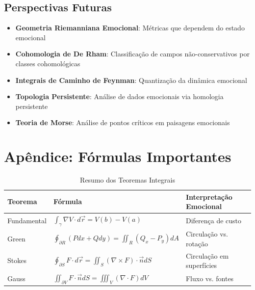 \documentclass[12pt, a4paper]{article}
\begin{document}
\subsection{Perspectivas Futuras}

\begin{itemize}
\item \textbf{Geometria Riemanniana Emocional}: Métricas que dependem do estado emocional
\item \textbf{Cohomologia de De Rham}: Classificação de campos não-conservativos por classes cohomológicas
\item \textbf{Integrais de Caminho de Feynman}: Quantização da dinâmica emocional
\item \textbf{Topologia Persistente}: Análise de dados emocionais via homologia persistente
\item \textbf{Teoria de Morse}: Análise de pontos críticos em paisagens emocionais
\end{itemize}

\section*{Apêndice: Fórmulas Importantes}

\begin{table}[H]
\centering
\caption{Resumo dos Teoremas Integrais}
\begin{tabular}{p{4cm}p{6cm}p{4cm}}
\toprule
\textbf{Teorema} & \textbf{Fórmula} & \textbf{Interpretação Emocional} \\
\midrule
Fundamental & $\int_\gamma \nabla V \cdot d\vec{r} = V(b) - V(a)$ & Diferença de custo \\
\hline
Green & $\oint_{\partial R} (P dx + Q dy) = \iint_R (Q_x - P_y) dA$ & Circulação vs. rotação \\
\hline
Stokes & $\oint_{\partial S} F \cdot d\vec{r} = \iint_S (\nabla \times F) \cdot \vec{n} dS$ & Circulação em superfícies \\
\hline
Gauss & $\iint_{\partial V} F \cdot \vec{n} dS = \iiint_V (\nabla \cdot F) dV$ & Fluxo vs. fontes \\
\bottomrule
\end{tabular}
\end{table}
\end{document}
